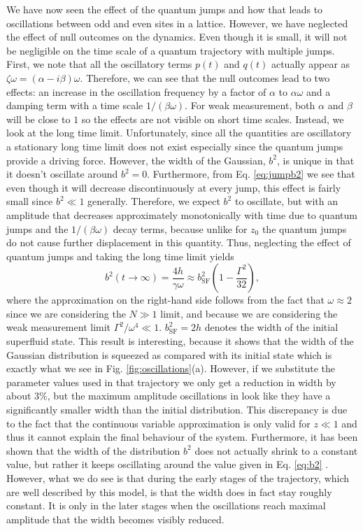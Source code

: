 We have now seen the effect of the quantum jumps and how that leads to
oscillations between odd and even sites in a lattice. However, we have
neglected the effect of null outcomes on the dynamics. Even though it
is small, it will not be negligible on the time scale of a quantum
trajectory with multiple jumps. First, we note that all the
oscillatory terms $p(t)$ and $q(t)$ actually appear as
$\zeta \omega = (\alpha - i \beta) \omega$. Therefore, we can see that
the null outcomes lead to two effects: an increase in the oscillation
frequency by a factor of $\alpha$ to $\alpha \omega$ and a damping
term with a time scale $1/(\beta \omega)$. For weak measurement, both
$\alpha$ and $\beta$ will be close to $1$ so the effects are not
visible on short time scales. Instead, we look at the long time
limit. Unfortunately, since all the quantities are oscillatory a
stationary long time limit does not exist especially since the quantum
jumps provide a driving force. However, the width of the Gaussian,
$b^2$, is unique in that it doesn't oscillate around $b^2 =
0$. Furthermore, from Eq. \eqref{eq:jumpb2} we see that even though it
will decrease discontinuously at every jump, this effect is fairly
small since $b^2 \ll 1$ generally. Therefore, we expect $b^2$ to
oscillate, but with an amplitude that decreases approximately
monotonically with time due to quantum jumps and the
$1/(\beta \omega)$ decay terms, because unlike for $z_0$ the quantum
jumps do not cause further displacement in this quantity. Thus,
neglecting the effect of quantum jumps and taking the long time limit
yields
\begin{equation}
  \label{eq:b2}
  b^2(t \rightarrow \infty) = \frac{4 h} {\gamma \omega} \approx
  b^2_\mathrm{SF} \left( 1 - \frac{\Gamma^2}{32} \right),
\end{equation}
where the approximation on the right-hand side follows from the fact
that $\omega \approx 2$ since we are considering the $N \gg 1$ limit,
and because we are considering the weak measurement limit
$\Gamma^2 / \omega^4 \ll 1$. $b^2_\mathrm{SF} = 2h$ denotes the width
of the initial superfluid state. This result is interesting, because
it shows that the width of the Gaussian distribution is squeezed as
compared with its initial state which is exactly what we see in
Fig. \ref{fig:oscillations}(a). However, if we substitute the
parameter values used in that trajectory we only get a reduction in
width by about $3\%$, but the maximum amplitude oscillations in look
like they have a significantly smaller width than the initial
distribution. This discrepancy is due to the fact that the continuous
variable approximation is only valid for $z \ll 1$ and thus it cannot
explain the final behaviour of the system. Furthermore, it has been
shown that the width of the distribution $b^2$ does not actually
shrink to a constant value, but rather it keeps oscillating around the
value given in Eq. \eqref{eq:b2} \cite{mazzucchi2016njp}. However,
what we do see is that during the early stages of the trajectory,
which are well described by this model, is that the width does in fact
stay roughly constant. It is only in the later stages when the
oscillations reach maximal amplitude that the width becomes visibly
reduced.

